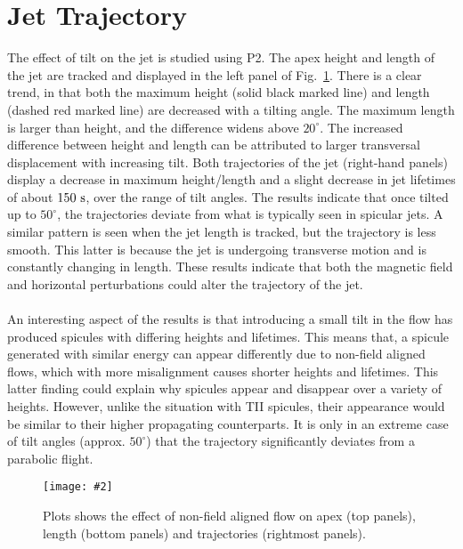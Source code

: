 \documentclass[12pt]{ociamthesis}
\newcommand{\mfig}[4]{
  \begin{figure}
  \begin{center}
  \texttt{[image: \#2]}
  \caption{#3}
  \label{#4}
  \end{center}
  \end{figure}}
\newcommand{\np}{\\ \\}
\begin{document}
\section{Jet Trajectory}
\label{sec:j_traj_t}
The effect of tilt on the jet is studied using P2. The apex height and length of the jet are tracked and displayed in the left panel of Fig.~\ref{tilt_effect_traj}. There is a clear trend, in that both the maximum height (solid black marked line) and length (dashed red marked line) are decreased with a tilting angle. The maximum length is larger than height, and the difference widens above $20^{\circ}$. The increased difference between height and length can be attributed to larger transversal displacement with increasing tilt. Both trajectories of the jet (right-hand panels) display a decrease in maximum height/length and a slight decrease in jet lifetimes of about $150~\rm{s}$, over the range of tilt angles. The results indicate that once tilted up to $50^{\circ}$, the trajectories deviate from what is typically seen in spicular jets. A similar pattern is seen when the jet length is tracked, but the trajectory is less smooth. This latter is because the jet is undergoing transverse motion and is constantly changing in length. These results indicate that both the magnetic field and horizontal perturbations could alter the trajectory of the jet. \np 
%
An interesting aspect of the results is that introducing a small tilt in the flow has produced spicules with differing heights and lifetimes. This means that, a spicule generated with similar energy can appear differently due to non-field aligned flows, which with more misalignment causes shorter heights and lifetimes. This latter finding could explain why spicules appear and disappear over a variety of heights. However, unlike the situation with TII spicules, their appearance would be similar to their higher propagating counterparts. It is only in an extreme case of tilt angles (approx. $50^{\circ}$) that the trajectory significantly deviates from a parabolic flight.
%
\mfig{1}{figures/combine_L_h_comp.png}{Plots shows the effect of non-field aligned flow on apex (top panels), length (bottom panels) and trajectories (rightmost panels).}{tilt_effect_traj}
\end{document}
